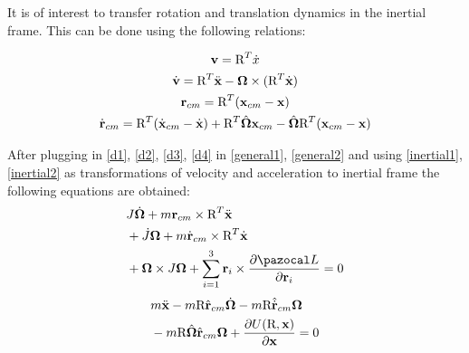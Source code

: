 It is of interest to transfer rotation and translation dynamics in the inertial frame. This can be done using the following relations:

\begin{gather}
	\textbf{v} = \text{R}^T \dot{x} \label{inertial1}\\
	\dot{\textbf{v}} = \text{R}^T \ddot{\textbf{x}} - \boldsymbol{\Omega} \times (\text{R}^T \dot{\textbf{x}} ) \label{inertial2} \\
	\textbf{r}_{cm} = \text{R}^T(\textbf{x}_{cm} - \textbf{x}) \label{inertial3} \\
	\dot{\textbf{r}}_{cm} = \text{R}^T(\dot{\textbf{x}}_{cm} - \dot{\textbf{x}}) + \text{R}^T\hat{\boldsymbol{\Omega}}\textbf{x}_{cm} - \hat{\boldsymbol{\Omega}}\text{R}^T(\textbf{x}_{cm} - \textbf{x}) \label{inertial4}
\end{gather}


After plugging in \ref{d1}, \ref{d2}, \ref{d3}, \ref{d4} in \ref{general1}, \ref{general2} and using \ref{inertial1}, \ref{inertial2} as transformations of velocity and acceleration to inertial frame the following equations are obtained:
\begin{align}
	\begin{split}
		& J\dot{\mb{\Omega}} + m \textbf{r}_{cm} \times \text{R}^T \ddot{\textbf{x}} \\
		&+ \dot{J} \mb{\Omega} + m\dot{\textbf{r}}_{cm} \times \text{R}^T \dot{\textbf{x}} \\
		&+ \mb{\Omega} \times J\mb{\Omega} + \sum_{i=1}^{3} \textbf{r}_i \times \frac{\partial \La}{\partial \textbf{r}_i} = 0
	\end{split}
\end{align}
\begin{align}
	\begin{split}
		& m\ddot{\textbf{x}} - m\text{R}\hat{\textbf{r}}_{cm} \dot{\boldsymbol{\Omega}} - m\text{R}\hat{\dot{\textbf{r}}}_{cm}\boldsymbol{\Omega}\\
		&-m\text{R}\hat{\boldsymbol{\Omega}}\hat{\textbf{r}}_{cm}\boldsymbol{\Omega} + \frac{\partial U(\text{R},\textbf{x})}{\partial \textbf{x}} = 0
	\end{split}
\end{align}

